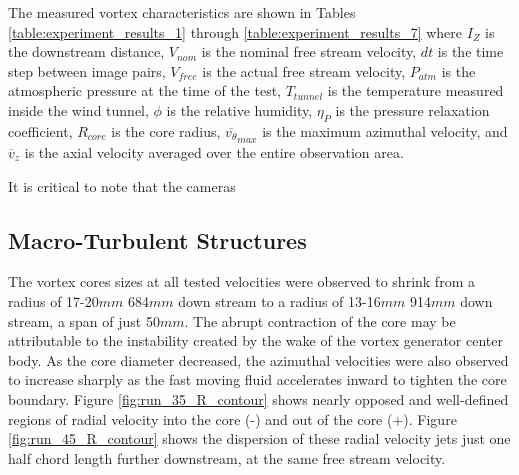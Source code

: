 

The measured vortex characteristics are shown in Tables
\ref{table:experiment_results_1} through \ref{table:experiment_results_7} where 
$I_Z$ is the downstream distance, 
$V_{nom}$ is the nominal free stream velocity, $dt$ is the time step between 
image pairs, $V_{free}$ is the actual free stream velocity, $P_{atm}$ is the 
atmospheric pressure at the time of the test, 
$T_{tunnel}$ is the temperature measured inside the wind tunnel, $\phi$ is the 
relative humidity, $\eta_P$ is the pressure relaxation coefficient, $R_{core}$ 
is the core radius, $\overline{v_{\theta}}_{max}$ 
is the maximum azimuthal velocity, and $\overline{v}_{z}$ is the axial 
velocity averaged over the entire observation area.

It is critical to note that the cameras 









\subsection{Macro-Turbulent Structures}
\label{section:macroturb}

The vortex cores sizes at all tested velocities were observed to shrink from 
a radius of 17-20$mm$ 684$mm$ down stream to a radius of 13-16$mm$ 914$mm$ down 
stream, a span of just 50$mm$. The abrupt contraction of the core 
may be attributable to the instability created by the wake of the vortex 
generator center body. As the core diameter decreased, the azimuthal velocities 
were also observed to increase sharply as the fast moving fluid accelerates 
inward to tighten the core boundary. Figure \ref{fig:run_35_R_contour} shows 
nearly opposed and well-defined regions of radial velocity into the core (-) 
and out of the core (+). Figure \ref{fig:run_45_R_contour} shows the dispersion 
of these radial velocity jets just one half chord length further downstream, at 
the same free stream velocity. 




